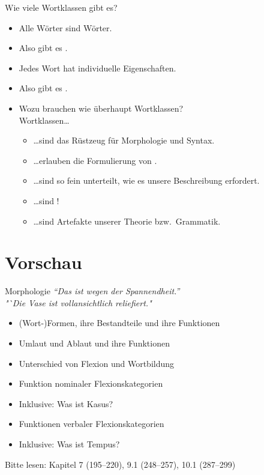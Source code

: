 \begin{frame}
  {Wie viele Wortklassen gibt es?}
  \pause
  \begin{itemize}[<+->]
    \item Alle Wörter sind \alert{Wörter}.
    \item Also gibt es .
      \Zeile
    \item Jedes Wort hat \alert{individuelle Eigenschaften}.
    \item Also gibt es .
      \Zeile
    \item Wozu brauchen wie überhaupt Wortklassen?\\
      Wortklassen\dots
      \begin{itemize}[<+->]
        \item \dots sind \alert{das Rüstzeug für Morphologie und Syntax}.
        \item \dots erlauben die Formulierung von .
        \item \dots sind so fein unterteilt, wie es unsere Beschreibung erfordert.
        \item \dots sind !
        \item \dots sind \alert{Artefakte unserer Theorie bzw.\ Grammatik}.
      \end{itemize}
  \end{itemize}
\end{frame}

\section{Vorschau}

\begin{frame}
  {Morphologie}
  \pause
  \textit{"`Das ist wegen der Spannendheit."'}\\
  \pause
  \textit{"`Die Vase ist vollansichtlich reliefiert."}\\
  \Zeile
  \pause
  \begin{itemize}[<+->]
    \item (Wort-)Formen, ihre Bestandteile und ihre Funktionen
    \item Umlaut und Ablaut und ihre Funktionen
    \item Unterschied von Flexion und Wortbildung
      \Zeile
    \item Funktion nominaler Flexionskategorien
    \item {} \alert{Inklusive: Was ist Kasus?}
    \item Funktionen verbaler Flexionskategorien
    \item {} \alert{Inklusive: Was ist Tempus?}
  \end{itemize}
  \pause
  \Zeile
  \centering
  Bitte lesen: \alert{Kapitel 7 (195--220), 9.1 (248--257), 10.1 (287--299)}

  \pause
  \pause
  \pause
  \pause
  \pause
\end{frame}

